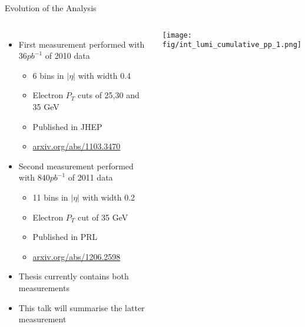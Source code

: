 \documentclass[8pt]{beamer}
\begin{document}
\begin{frame}{Evolution of the Analysis}
  \begin{columns}[c]
    \begin{itemize}
      \item First measurement performed with $36 pb^{-1}$ of 2010 data
      \begin{itemize}
        \item 6 bins in $|\eta|$ with width 0.4
        \item Electron $P_T$ cuts of 25,30 and 35 GeV
        \item Published in JHEP
        \item \url{arxiv.org/abs/1103.3470}
      \end{itemize}
      \item Second measurement performed with $840 pb^{-1}$ of 2011 data
      \begin{itemize}
        \item 11 bins in $|\eta|$ with width 0.2
        \item Electron $P_T$ cut of 35 GeV
        \item Published in PRL
        \item \url{arxiv.org/abs/1206.2598}
      \end{itemize}
      \item Thesis currently contains both measurements
      \item This talk will summarise the latter measurement
    \end{itemize}
    \texttt{[image: fig/int\_lumi\_cumulative\_pp\_1.png]}
  \end{columns}
\end{frame}
\end{document}
